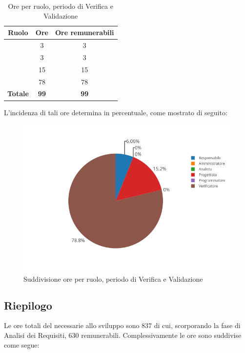 \begin{table}[H]
	\begin{center}
		\begin{tabular}{|c|c|c|}
			\hline
			\textbf{Ruolo}	& \textbf{Ore}	& \textbf{Ore remunerabili} \\
			\hline
			\Res	&	3  &	3	\\
			\hline
			\Amm	&	3  &	3	\\
			\hline
			\Prog   &	15  &	15	\\
			\hline
			\Ver	&	78	&	78	\\
			\hline
			\textbf{Totale} & \textbf{99} & \textbf{99} \\
			\hline
		\end{tabular}
	\end{center}
	\caption{Ore per ruolo, periodo di Verifica e Validazione}
\end{table}

L'incidenza di tali ore determina in percentuale, come mostrato di seguito:
\begin{figure}[H]
	\centering
	\includegraphics[scale=0.6]{img/Validazione.png}
	\caption{Suddivisione ore per ruolo, periodo di Verifica e Validazione}
\end{figure}

\subsection{Riepilogo}
Le ore totali del necessarie allo sviluppo sono 837 di cui, scorporando la fase di Analisi dei Requisiti, 630 remunerabili. Complessivamente le ore sono suddivise come segue:

